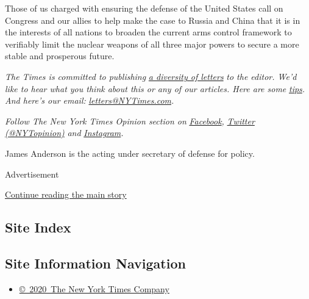 Those of us charged with ensuring the defense of the United States call
on Congress and our allies to help make the case to Russia and China
that it is in the interests of all nations to broaden the current arms
control framework to verifiably limit the nuclear weapons of all three
major powers to secure a more stable and prosperous future.

\emph{The Times is committed to publishing}
\href{https://www.nytimes3xbfgragh.onion/2019/01/31/opinion/letters/letters-to-editor-new-york-times-women.html}{\emph{a
diversity of letters}} \emph{to the editor. We'd like to hear what you
think about this or any of our articles. Here are some}
\href{https://help.nytimes3xbfgragh.onion/hc/en-us/articles/115014925288-How-to-submit-a-letter-to-the-editor}{\emph{tips}}\emph{.
And here's our email:}
\href{mailto:letters@NYTimes.com}{\emph{letters@NYTimes.com}}\emph{.}

\emph{Follow The New York Times Opinion section on}
\href{https://www.facebookcorewwwi.onion/nytopinion}{\emph{Facebook}}\emph{,}
\href{http://twitter.com/NYTOpinion}{\emph{Twitter (@NYTopinion)}}
\emph{and}
\href{https://www.instagram.com/nytopinion/}{\emph{Instagram}}\emph{.}

James Anderson is the acting under secretary of defense for policy.

Advertisement

\protect\hyperlink{after-bottom}{Continue reading the main story}

\hypertarget{site-index}{%
\subsection{Site Index}\label{site-index}}

\hypertarget{site-information-navigation}{%
\subsection{Site Information
Navigation}\label{site-information-navigation}}

\begin{itemize}
\tightlist
\item
  \href{https://help.nytimes3xbfgragh.onion/hc/en-us/articles/115014792127-Copyright-notice}{©~2020~The
  New York Times Company}
\end{itemize}

